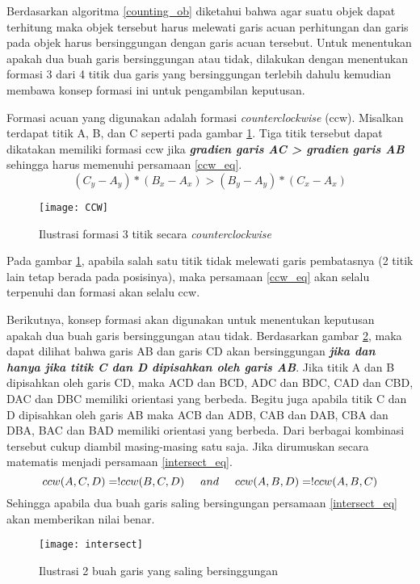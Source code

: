 \documentclass[../thesis.tex]{subfiles}
\begin{document}
Berdasarkan algoritma \ref{counting_ob} diketahui bahwa agar suatu objek dapat terhitung maka objek tersebut harus melewati garis acuan perhitungan dan garis pada objek harus bersinggungan dengan garis acuan tersebut. 
Untuk menentukan apakah dua buah garis bersinggungan atau tidak, dilakukan dengan menentukan formasi 3 dari 4 titik dua garis yang bersinggungan terlebih dahulu kemudian membawa konsep formasi ini untuk pengambilan keputusan. 

Formasi acuan yang digunakan adalah formasi \textit{counterclockwise} (ccw). Misalkan terdapat titik A, B, dan C seperti pada gambar \ref{ccw_img}. Tiga titik tersebut dapat dikatakan memiliki formasi ccw jika \textbf{\textit{gradien garis AC > gradien garis AB}}
sehingga harus memenuhi persamaan \ref{ccw_eq}.
\begin{equation} \label{ccw_eq}
	(C_y - A_y)*(B_x - A_x) > (B_y - A_y)*(C_x - A_x)
\end{equation}

\begin{figure}[htp]
	\centering
	\texttt{[image: CCW]}
	\caption{Ilustrasi formasi 3 titik secara \textit{counterclockwise}}
	\label{ccw_img}
\end{figure}
Pada gambar \ref{ccw_img}, apabila salah satu titik tidak melewati garis pembatasnya (2 titik lain tetap berada pada posisinya), maka persamaan \ref{ccw_eq} akan selalu terpenuhi dan formasi akan selalu ccw.

Berikutnya, konsep formasi akan digunakan untuk menentukan keputusan apakah dua buah garis bersinggungan atau tidak. Berdasarkan gambar \ref{intersect_img}, maka dapat dilihat bahwa garis AB dan garis CD akan bersinggungan \textbf{\textit{jika dan hanya jika titik C dan D dipisahkan oleh garis AB}}.
Jika titik A dan B dipisahkan oleh garis CD, maka ACD dan BCD, ADC dan BDC, CAD dan CBD, DAC dan DBC memiliki orientasi yang berbeda. Begitu juga apabila titik C dan D dipisahkan oleh garis AB maka ACB dan ADB, CAB dan DAB, CBA dan DBA, BAC dan BAD memiliki orientasi yang berbeda. Dari berbagai kombinasi tersebut cukup diambil masing-masing satu saja.
Jika dirumuskan secara matematis menjadi persamaan \ref{intersect_eq}.
\begin{equation} \label{intersect_eq}
	ccw(A,C,D) =! ccw(B,C,D) \hspace{5mm} and \hspace{5mm} ccw(A,B,D) =! ccw(A,B,C)
\end{equation}
Sehingga apabila dua buah garis saling bersingungan persamaan \ref{intersect_eq} akan memberikan nilai benar.
\begin{figure}[htp]
	\centering
	\texttt{[image: intersect]}
	\caption{Ilustrasi 2 buah garis yang saling bersinggungan}
	\label{intersect_img}
\end{figure}
\end{document}
